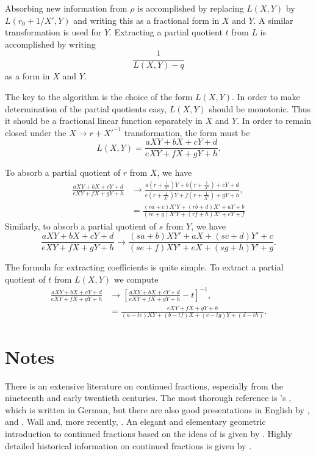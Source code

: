 Absorbing new information from $\rho$ is accomplished by replacing
$L(X,Y)$ by $L(r_0 + 1/X',Y)$ and writing this as a fractional form in
$X$ and $Y$.  A similar transformation is used for $Y$.
Extracting a partial quotient $t$ from $L$ is accomplished by writing
\[
\frac{1}{L(X,Y)-q}
\]
as a form in $X$ and $Y$.

The key to the algorithm is the choice of the form $L(X,Y)$.  In order
to make determination of the partial quotients easy, $L(X,Y)$ should
be monotonic. Thus it should be a fractional linear function
separately in $X$ and $Y$.  In order to remain closed under the 
$X \rightarrow r + {X'}^{-1}$ transformation, the form must
be
\[
L(X, Y) = \frac{aXY + b X + c Y + d}{e XY + f X + g Y + h}.
\]

To absorb a partial quotient of $r$ from $X$, we have
\[
\begin{aligned}
 \frac{aXY + b X + c Y + d}{e XY + f X + g Y + h} &\longrightarrow
 \frac{a\left(r + \frac{1}{X'}\right)Y + b \left(r + \frac{1}{X'}\right) + c Y + d}{e \left(r + \frac{1}{X'}\right)Y + f \left(r + \frac{1}{X'}\right) + g Y + h},\\
&= \frac{(r a + c)X'Y + (rb + d) X' + a Y + b}{(r e + g)X'Y + (rf + h) X' + e Y + f}
\end{aligned}
\]
Similarly, to absorb a partial quotient of $s$ from $Y$, we have
\[
 \frac{aXY + b X + c Y + d}{e XY + f X + g Y + h} \longrightarrow
\frac{(s a + b)XY' + a X + (sc + d) Y' + c}{(s e + f)XY' + e X + (sg + h)
Y' + g}.
\]

The formula for extracting  coefficients is quite simple.  To extract
a partial quotient of $t$ from $L(X,Y)$ we compute
\[
\begin{aligned}
 \frac{aXY + b X + c Y + d}{e XY + f X + g Y + h} &\longrightarrow
 \left[ \frac{aXY + b X + c Y + d}{e XY + f X + g Y + h} -
t\right]^{-1}, \\
 & =  \frac{e XY + f X + g Y + h}{(a - t e)XY + (b- tf) X + (c - tg) Y
+ (d - th)}.
\end{aligned}
\]

\section*{Notes}


\small

There is an extensive literature on continued fractions, especially
from the nineteenth and early twentieth centuries.  The most thorough
reference is {\Perron}'s \cite{Perron:CF}, which is written in German,
but there are also good presentations in English by {\Chrystal}
\cite{Chrystal:Algebra}, {\Hardy} and {\Wright} \cite{Hardy:Wright},
Wall \cite{Wall:CF} and, more recently, {\Olds} \cite{Olds:CF}.  An
elegant and elementary geometric introduction to continued fractions
based on the ideas of {\Klein} \cite{Klein:1895} is given by {\Stark}
\cite{Stark:1970}.  Highly detailed historical information on
continued fractions is given by {\Brezinski} \cite{Brezinski:1991}.


